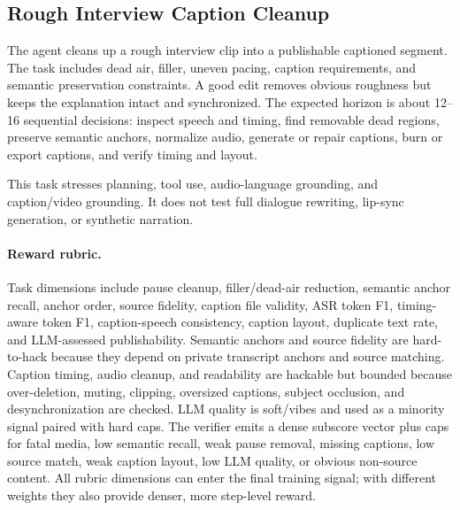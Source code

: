 \documentclass[11pt]{article}
\begin{document}
\subsection{Rough Interview Caption Cleanup}

The agent cleans up a rough interview clip into a publishable captioned segment. The task includes dead air, filler, uneven pacing, caption requirements, and semantic preservation constraints. A good edit removes obvious roughness but keeps the explanation intact and synchronized. The expected horizon is about 12--16 sequential decisions: inspect speech and timing, find removable dead regions, preserve semantic anchors, normalize audio, generate or repair captions, burn or export captions, and verify timing and layout.

This task stresses planning, tool use, audio-language grounding, and caption/video grounding. It does not test full dialogue rewriting, lip-sync generation, or synthetic narration.

\paragraph{Reward rubric.}
Task dimensions include pause cleanup, filler/dead-air reduction, semantic anchor recall, anchor order, source fidelity, caption file validity, ASR token F1, timing-aware token F1, caption-speech consistency, caption layout, duplicate text rate, and LLM-assessed publishability. Semantic anchors and source fidelity are hard-to-hack because they depend on private transcript anchors and source matching. Caption timing, audio cleanup, and readability are hackable but bounded because over-deletion, muting, clipping, oversized captions, subject occlusion, and desynchronization are checked. LLM quality is soft/vibes and used as a minority signal paired with hard caps. The verifier emits a dense subscore vector plus caps for fatal media, low semantic recall, weak pause removal, missing captions, low source match, weak caption layout, low LLM quality, or obvious non-source content. All rubric dimensions can enter the final training signal; with different weights they also provide denser, more step-level reward.
\end{document}
